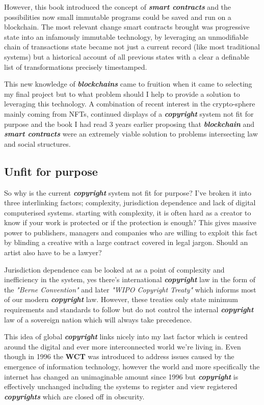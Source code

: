 \documentclass[12pt]{article}
\newcommand{\keyword}[1]{\textbf{\textit{#1}}}
\begin{document}
However, this book introduced the concept of \keyword{smart contracts} and the possibilities now small immutable programs could be saved and run on a blockchain. The most relevant change smart contracts brought was progressive state into an infamously immutable technology, by leveraging an unmodifiable chain of transactions state became not just a current record (like most traditional systems) but a historical account of all previous states with a clear a definable list of transformations precisely timestamped.

This new knowledge of \keyword{blockchains} came to fruition when it came to selecting my final project but to what problem should I help to provide a solution to leveraging this technology. A combination of recent interest in the crypto-sphere mainly coming from NFTs, continued displays of a \keyword{copyright} system not fit for purpose\cite{DMCA-abuse} and the book I had read 3 years earlier proposing that \keyword{blockchain} and \keyword{smart contracts} were an extremely viable solution to problems intersecting law and social structures.

\subsection{Unfit for purpose}

So why is the current \keyword{copyright} system not fit for purpose? I've broken it into three interlinking factors; complexity, jurisdiction dependence and lack of digital computerised systems. starting with complexity, it is often hard as a creator to know if your work is protected or if the protection is enough? This gives massive power to publishers, managers and companies who are willing to exploit this fact by blinding a creative with a large contract covered in legal jargon. Should an artist also have to be a lawyer?

Jurisdiction dependence can be looked at as a point of complexity and inefficiency in the system, yes there's international \keyword{copyright} law in the form of the \textit{"Berne Convention"}\cite{Berne} and later \textit{"WIPO Copyright Treaty"}\cite{WIPO} which informs most of our modern \keyword{copyright} law. However, these treaties only state minimum requirements and standards to follow but do not control the internal \keyword{copyright} law of a sovereign nation which will always take precedence.

This idea of global \keyword{copyright} links nicely into my last factor which is centred around the digital and ever more interconnected world we're living in. Even though in 1996 the \textbf{WCT}\cite{WIPO} was introduced to address issues caused by the emergence of information technology, however the world and more specifically the internet has changed an unimaginable amount since 1996 but \keyword{copyright} is effectively unchanged including the systems to register and view registered \keyword{copyrights} which are closed off in obscurity.
\end{document}
